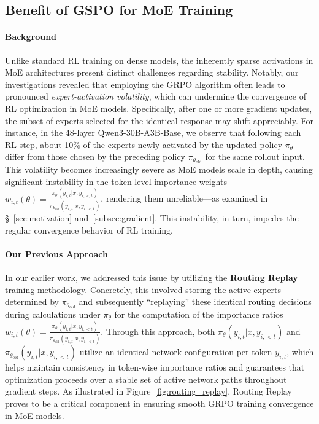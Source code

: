 \subsection{Benefit of GSPO for MoE Training}
\label{subsec:routing_replay}

\paragraph{Background}
Unlike standard RL training on dense models, the inherently sparse activations in MoE architectures present distinct challenges regarding stability. Notably, our investigations revealed that employing the GRPO algorithm often leads to pronounced \textit{expert-activation volatility}, which can undermine the convergence of RL optimization in MoE models. Specifically, after one or more gradient updates, the subset of experts selected for the identical response may shift appreciably. For instance, in the 48-layer Qwen3-30B-A3B-Base, we observe that following each RL step, about 10\% of the experts newly activated by the updated policy $\pi_{\theta}$ differ from those chosen by the preceding policy $\pi_{\theta_\text{old}}$ for the same rollout input. This volatility becomes increasingly severe as MoE models scale in depth, causing significant instability in the token-level importance weights $w_{i,t}(\theta) = \frac{ \pi_{\theta} (y_{i,t} | x, y_{i,<t}) }{ \pi_{\theta_\text{old}} (y_{i,t} | x,y_{i,<t})}$, rendering them unreliable—as examined in \S~\ref{sec:motivation} and~\ref{subsec:gradient}. This instability, in turn, impedes the regular convergence behavior of RL training.

\paragraph{Our Previous Approach} In our earlier work, we addressed this issue by utilizing the \textbf{Routing Replay} training methodology. Concretely, this involved storing the active experts determined by $\pi_{\theta_\text{old}}$ and subsequently “replaying” these identical routing decisions during calculations under $\pi_{\theta}$ for the computation of the importance ratios $w_{i,t}(\theta) = \frac{ \pi_{\theta} (y_{i,t} | x, y_{i,<t}) }{ \pi_{\theta_\text{old}} (y_{i,t} | x,y_{i,<t})}$. Through this approach, both $\pi_{\theta} (y_{i,t} | x, y_{i,<t})$ and $\pi_{\theta_\text{old}} (y_{i,t} | x,y_{i,<t})$ utilize an identical network configuration per token $y_{i,t}$, which helps maintain consistency in token-wise importance ratios and guarantees that optimization proceeds over a stable set of active network paths throughout gradient steps. As illustrated in Figure~\ref{fig:routing_replay}, Routing Replay proves to be a critical component in ensuring smooth GRPO training convergence in MoE models.

